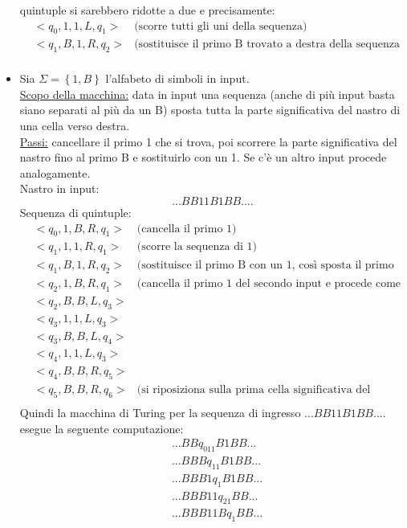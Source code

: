 \begin{itemize}
\begin{osservazione}
quintuple si sarebbero ridotte a due e precisamente:
\begin{eqnarray*}
&<q_0,1,1,L,q_1>&\mbox{(scorre tutti gli uni della sequenza)}\\
&<q_1,B,1,R,q_2>&\mbox{(sostituisce il primo B trovato a destra della sequenza con un 1)}\\
\end{eqnarray*}
\end{osservazione}
\item Sia $\Sigma=\left\{1,B\right\}$ l'alfabeto di simboli in
  input.\\\underline{Scopo della macchina:} data in input una sequenza
  (anche di pi\`u input basta siano separati al pi\`u da un B) sposta
  tutta la parte significativa del nastro di una cella verso
  destra.\\ \underline{Passi:} cancellare il primo 1 che si trova, poi
  scorrere la parte significativa del nastro fino al primo B e
  sostituirlo con un 1. Se c'\`e un altro input procede
  analogamente.\\ Nastro in input:$$...BB11B1BB....$$ Sequenza di
  quintuple:
\begin{eqnarray*}
&<q_0,1,B,R,q_1>&\mbox{(cancella il primo 1)}\\
&<q_1,1,1,R,q_1>&\mbox{(scorre la sequenza di 1)}\\
&<q_1,B,1,R,q_2>&\mbox{(sostituisce il primo B con un 1, cos\`i sposta il primo blocco)}\\
&<q_2,1,B,R,q_1>&\mbox{(cancella il primo 1 del secondo input e procede come prima)}\\
&<q_2,B,B,L,q_3>&\\
&<q_3,1,1,L,q_3>&\\
&<q_3,B,B,L,q_4>&\\
&<q_4,1,1,L,q_3>&\\
&<q_4,B,B,R,q_5>&\\
&<q_5,B,B,R,q_6>&\mbox{(si riposiziona sulla prima cella significativa del nastro)}\\
\end{eqnarray*}
Quindi la macchina di Turing per la sequenza di ingresso $...BB11B1BB....$ esegue la seguente computazione:
\begin{eqnarray*}
&...BBq_011B1BB...\\
&...BBBq_11B1BB...\\
&...BBB1q_1B1BB...\\
&...BBB11q_21BB...\\
&...BBB11Bq_1BB...\\

\end{eqnarray*}
\end{itemize}
